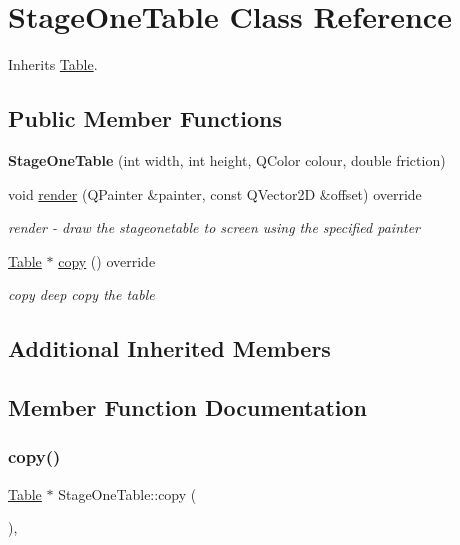 \hypertarget{class_stage_one_table}{}\section{Stage\+One\+Table Class Reference}
\label{class_stage_one_table}


Inherits \mbox{\hyperlink{class_table}{Table}}.

\subsection*{Public Member Functions}
\begin{DoxyCompactItemize}
\item 
\mbox{\label{class_stage_one_table_ae7bc7a1e4b873759a40039af326b38b9}} 
{\bfseries Stage\+One\+Table} (int width, int height, Q\+Color colour, double friction)
\item 
void \mbox{\hyperlink{class_stage_one_table_a1f6dac59ce45c370f94fb3710f744ceb}{render}} (Q\+Painter \&painter, const Q\+Vector2D \&offset) override
\begin{DoxyCompactList}\small\item\em render -\/ draw the stageonetable to screen using the specified painter \end{DoxyCompactList}\item 
\mbox{\hyperlink{class_table}{Table}} $\ast$ \mbox{\hyperlink{class_stage_one_table_a03bc7541b29521436c618818d8e8b3dc}{copy}} () override
\begin{DoxyCompactList}\small\item\em copy deep copy the table \end{DoxyCompactList}\end{DoxyCompactItemize}
\subsection*{Additional Inherited Members}


\subsection{Member Function Documentation}
\mbox{\label{class_stage_one_table_a03bc7541b29521436c618818d8e8b3dc}} 
\subsubsection{\texorpdfstring{copy()}{copy()}}
{\footnotesize\ttfamily \mbox{\hyperlink{class_table}{Table}} $\ast$ Stage\+One\+Table\+::copy (\begin{DoxyParamCaption}{ }\end{DoxyParamCaption})\hspace{0.3cm}{\ttfamily [override]}, {\ttfamily [virtual]}}



